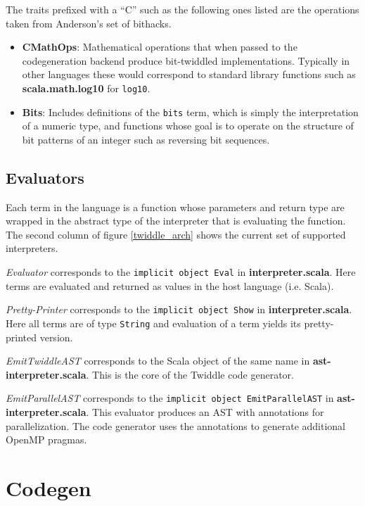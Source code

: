\documentclass{article}
\begin{document}
The traits prefixed with a ``C'' such as the following ones listed are the operations taken from Anderson's set of bithacks\cite{anderson2005bit}.
\begin{itemize}
	\item \textbf{CMathOps}: Mathematical operations that when passed to the codegeneration backend produce bit-twiddled implementations. Typically in other languages these would correspond to standard library functions such as \textbf{scala.math.log10} for \texttt{log10}.
	\item \textbf{Bits}: Includes definitions of the \texttt{bits} term, which is simply the interpretation of a numeric type, and functions whose goal is to operate on the structure of bit patterns of an integer such as reversing bit sequences.
\end{itemize}

\subsection{Evaluators}
Each term in the language is a function whose parameters and return type are wrapped in the abstract type of the interpreter that is evaluating the function. The second column of figure \ref{twiddle_arch} shows the current set of supported interpreters.

\textit{Evaluator} corresponds to the \texttt{implicit object Eval} in \textbf{interpreter.scala}. Here terms are evaluated and returned as values in the host language (i.e. Scala).

\textit{Pretty-Printer} corresponds to the \texttt{implicit object Show} in \textbf{interpreter.scala}. Here all terms are of type \texttt{String} and evaluation of a term yields its pretty-printed version.

\textit{EmitTwiddleAST} corresponds to the Scala object of the same name in \textbf{ast-interpreter.scala}. This is the core of the Twiddle code generator.

\textit{EmitParallelAST} corresponds to the \texttt{implicit object EmitParallelAST} in \textbf{ast-interpreter.scala}. This evaluator produces an AST with annotations for parallelization. The code generator uses the annotations to generate additional OpenMP pragmas.

\section{Codegen}
\end{document}
